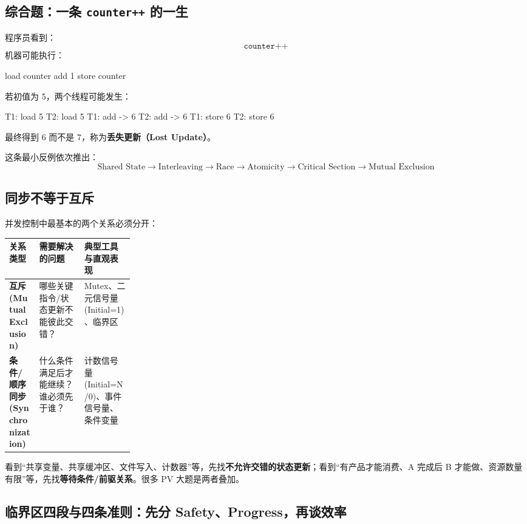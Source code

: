\documentclass[11pt,a4paper]{ctexart}
\newcommand{\kw}[1]{\textbf{#1}}
\newcommand{\code}[1]{\texttt{#1}}
\begin{document}
\subsection{综合题：一条 \code{counter++} 的一生}

程序员看到：
\[
\texttt{counter++}
\]
机器可能执行：
\begin{codeblock}
load counter
add 1
store counter
\end{codeblock}
若初值为 5，两个线程可能发生：
\begin{codeblock}
T1: load 5
T2: load 5
T1: add  -> 6
T2: add  -> 6
T1: store 6
T2: store 6
\end{codeblock}
最终得到 6 而不是 7，称为\kw{丢失更新（Lost Update）}。

这条最小反例依次推出：
\[
\boxed{
\text{Shared State}
\to\text{Interleaving}
\to\text{Race}
\to\text{Atomicity}
\to\text{Critical Section}
\to\text{Mutual Exclusion}
}
\]

\subsection{同步不等于互斥}

并发控制中最基本的两个关系必须分开：

\begingroup
\small
\renewcommand{\arraystretch}{1.25}
\setlength{\tabcolsep}{6pt}
\begin{tabularx}{\linewidth}{>{\bfseries}p{0.24\linewidth} X X}
\toprule
关系类型 & 需要解决的问题 & 典型工具与直观表现\\
\midrule
互斥 (Mutual Exclusion) & 哪些关键指令/状态更新不能彼此交错？ & Mutex、二元信号量 (Initial=1)、临界区\\
条件/顺序同步 (Synchronization) & 什么条件满足后才能继续？谁必须先于谁？ & 计数信号量 (Initial=N/0)、事件信号量、条件变量\\
\bottomrule
\end{tabularx}
\endgroup

\begin{exam}[考试识别]
看到“共享变量、共享缓冲区、文件写入、计数器”等，先找\kw{不允许交错的状态更新}；看到“有产品才能消费、A 完成后 B 才能做、资源数量有限”等，先找\kw{等待条件/前驱关系}。很多 PV 大题是两者叠加。
\end{exam}

\subsection{临界区四段与四条准则：先分 Safety、Progress，再谈效率}
\end{document}
